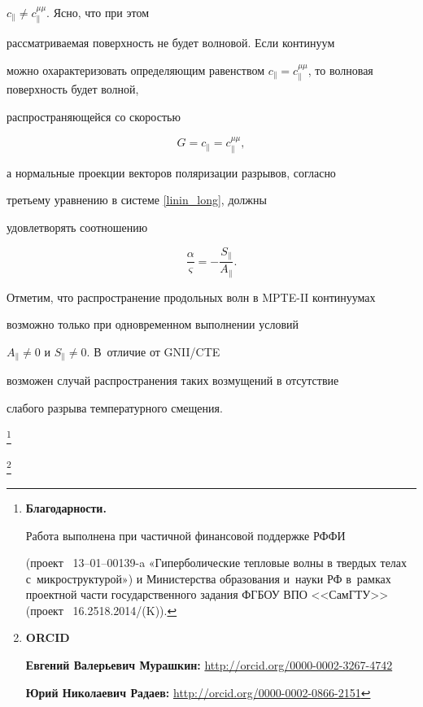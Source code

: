 $c_\parallel \neq c^{\mu \mu}_\parallel$. Ясно, что при этом

рассматриваемая поверхность не будет волновой. Если континуум

можно охарактеризовать определяющим равенством $c_\parallel =

c^{\mu \mu}_\parallel$, то волновая поверхность будет волной,

распространяющейся со скоростью

$$

G=c_\parallel=c^{\mu \mu}_\parallel,

$$

а нормальные проекции векторов поляризации разрывов, согласно

третьему уравнению в системе \eqref{linin_long}, должны

удовлетворять соотношению

$$

\dfrac{\alpha }{\varsigma}=- \dfrac{S_\parallel}{A_\parallel}.

$$



Отметим, что распространение продольных волн в MPTE-II континуумах

возможно только при одновременном выполнении условий

$A_\parallel\ne 0$ и $S_\parallel\ne 0$. В~отличие от GNII/CTE

возможен случай распространения таких возмущений в отсутствие

слабого разрыва температурного смещения.





\thanks{\textbf{Благодарности.} 

Работа выполнена при частичной финансовой поддержке РФФИ

(проект \No~13--01--00139-a «Гиперболические тепловые волны в твердых телах с~микроструктурой») и Министерства образования и~науки РФ в~рамках проектной части государственного задания ФГБОУ ВПО <<СамГТУ>> (проект \No~16.2518.2014/(K)).}



\thanks{{\bf ORCID}



{\bf Евгений Валерьевич Мурашкин:} \url{http://orcid.org/0000-0002-3267-4742}



{\bf Юрий Николаевич Радаев:} \url{http://orcid.org/0000-0002-0866-2151}





}





